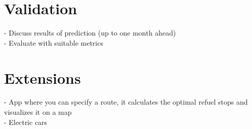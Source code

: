 \documentclass[%
a4paper,
DIV12,
2.5headlines,
bigheadings,
titlepage,
openbib,
]{scrartcl}
\begin{document}
\section{Validation}\label{validation}
- Discuss results of prediction (up to one month ahead)\\
- Evaluate with suitable metrics


\section{Extensions}\label{extensions}
- App where you can specify a route, it calculates the optimal refuel stops and visualizes it on a map\\ 
- Electric cars


 
\end{document}

